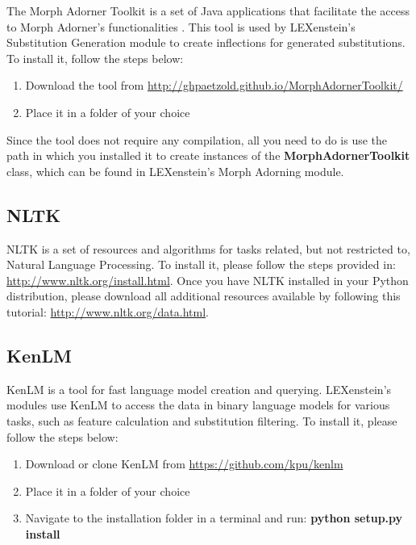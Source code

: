 The Morph Adorner Toolkit \cite{Paetzold15mat} is a set of Java applications that facilitate the access to Morph Adorner's functionalities \cite{morphadorner}. This tool is used by LEXenstein's Substitution Generation module to create inflections for generated substitutions. To install it, follow the steps below:

\begin{enumerate}
	\item Download the tool from \url{http://ghpaetzold.github.io/MorphAdornerToolkit/}
	\item Place it in a folder of your choice
\end{enumerate}

Since the tool does not require any compilation, all you need to do is use the path in which you installed it to create instances of the \textbf{MorphAdornerToolkit} class, which can be found in LEXenstein's Morph Adorning module.








\subsection{NLTK}

NLTK \cite{nltk} is a set of resources and algorithms for tasks related, but not restricted to, Natural Language Processing. To install it, please follow the steps provided in: \url{http://www.nltk.org/install.html}. Once you have NLTK installed in your Python distribution, please download all additional resources available by following this tutorial: \url{http://www.nltk.org/data.html}.






\subsection{KenLM}

KenLM \cite{kenlm} is a tool for fast language model creation and querying. LEXenstein's modules use KenLM to access the data in binary language models for various tasks, such as feature calculation and substitution filtering. To install it, please follow the steps below:

\begin{enumerate}
	\item Download or clone KenLM from \url{https://github.com/kpu/kenlm}
	\item Place it in a folder of your choice
	\item Navigate to the installation folder in a terminal and run: \textbf{python setup.py install}
\end{enumerate}

